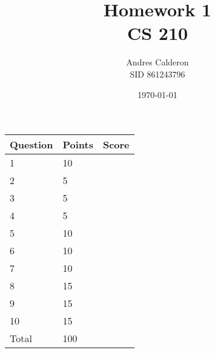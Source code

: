 \documentclass{article}
\title{Homework 1\\CS 210}
\author{Andres Calderon \\ SID 861243796}
\date{\today}
\begin{document}
\maketitle

\begin{center}
\begin{tabular}{|l|l|p{.4in}|}
\hline Question & Points & Score \\
\hline 1 & 10 & \\
\hline 2 &  5 & \\
\hline 3 &  5 & \\
\hline 4 &  5 & \\
\hline 5 & 10 & \\
\hline 6 & 10 & \\
\hline 7 & 10 & \\
\hline 8 & 15 & \\
\hline 9 & 15 & \\
\hline 10 & 15 & \\
\hline Total & 100 & \\
\hline 
\end{tabular}
\end{center}
\end{document}
